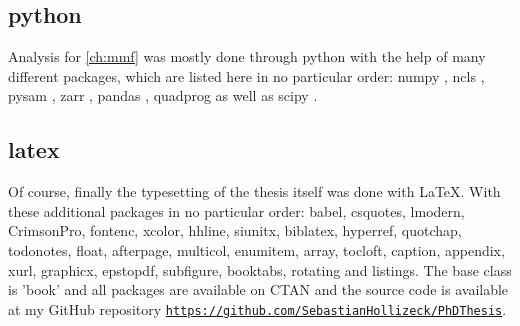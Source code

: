 {\subsection*{python}
Analysis for \autoref{ch:mmf} was mostly done through python \cite{VanRossum2010} with the help of many different packages, which are listed here in no particular order: numpy \cite{Harris2020}, ncls \cite{Stovner2019}, pysam \cite{Heger2021,Bonfield2021,Danecek2021}, zarr \cite{Miles2021}, pandas \cite{McKinney2010,Reback2021}, quadprog \cite{McGibbon2021} as well as scipy \cite{Virtanen2020}.

\subsection*{latex}
Of course, finally the typesetting of the thesis itself was done with \LaTeX. With these additional packages in no particular order: babel, csquotes, lmodern, CrimsonPro, fontenc, xcolor, hhline, siunitx, biblatex, hyperref, quotchap, todonotes, float, afterpage, multicol, enumitem, array, tocloft, caption, appendix, xurl, graphicx, epstopdf, subfigure, booktabs, rotating and listings. 
The base class is 'book' and all packages are available on CTAN and the source code is available at my GitHub repository \href{https://github.com/SebastianHollizeck/PhDThesis}{\nolinkurl{https://github.com/SebastianHollizeck/PhDThesis}}.

}

